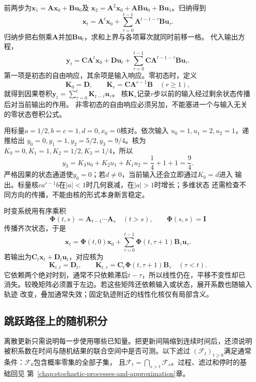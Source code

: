 前两步为$\bm x_1=\bm A\bm x_0+\bm B\bm u_0$及
$\bm x_2=\bm A^2\bm x_0+\bm A\bm B\bm u_0+\bm B\bm u_1$。归纳得到
\begin{equation}
  \bm x_t=\bm A^t\bm x_0+
    \sum_{\tau=0}^{t-1}\bm A^{t-1-\tau}\bm B\bm u_\tau.
  \label{eq:signal-analysis-state-unrolling}
\end{equation}
归纳步把右侧乘$\bm A$并加$\bm B\bm u_t$，求和上界与各项幂次就同时前移一格。
代入输出方程，
\begin{equation}
  \bm y_t=\bm C\bm A^t\bm x_0+\bm D\bm u_t+
    \sum_{\tau=0}^{t-1}\bm C\bm A^{t-1-\tau}\bm B\bm u_\tau.
  \label{eq:signal-analysis-state-convolution}
\end{equation}
第一项是初态的自由响应，其余项是输入响应。零初态时，定义
\begin{equation}
  \bm K_0=\bm D,\qquad
  \bm K_r=\bm C\bm A^{r-1}\bm B\quad(r\geq1),
  \label{eq:signal-analysis-state-kernel}
\end{equation}
就得到因果卷积$\bm y_t=\sum_{\tau=0}^t\bm K_{t-\tau}\bm u_\tau$。
核$\bm K_r$记录$r$步以前的输入经过剩余状态传播后对当前输出的作用。
非零初态的自由响应必须另加，不能塞进一个与输入无关的零状态卷积公式。

用标量$a=1/2,b=c=1,d=0,x_0=0$核对。依次输入
$u_0=1,u_1=2,u_2=1$，递推给出
$y_0=0,y_1=1,y_2=5/2,y_3=9/4$。核为
$K_0=0,K_1=1,K_2=1/2,K_3=1/4$，所以
\[
  y_3=K_3u_0+K_2u_1+K_1u_2=\frac14+1+1=\frac94.
\]
严格因果的状态通道使$y_0=0$；若$d\neq0$，当前输入还会立即通过$K_0=d$进入
输出。标量核$ca^{r-1}b$在$|a|<1$时几何衰减，在$|a|>1$时增长；多维状态
还需检查不同方向的传播，不能由核的形式本身断言稳定。

时变系统用有序乘积
\[
  \bm\Phi(t,s)=\bm A_{t-1}\cdots\bm A_s\quad(t>s),\qquad
  \bm\Phi(s,s)=\bm I
\]
传播齐次状态，于是
\[
  \bm x_t=\bm\Phi(t,0)\bm x_0+
    \sum_{\tau=0}^{t-1}\bm\Phi(t,\tau+1)\bm B_\tau\bm u_\tau.
\]
若输出为$\bm C_t\bm x_t+\bm D_t\bm u_t$，对应核为
\[
  \bm K_{t,t}=\bm D_t,\qquad
  \bm K_{t,\tau}=\bm C_t\bm\Phi(t,\tau+1)\bm B_\tau\quad(\tau<t).
\]
它依赖两个绝对时刻，通常不只依赖滞后$t-\tau$，所以线性仍在，平移不变性却已
消失。较晚矩阵必须置于左边。若这些矩阵还依赖输入或状态，展开系数也随输入轨迹
改变，叠加通常失效；固定轨迹附近的线性化核仅有局部含义。


\subsection{跳跃路径上的随机积分}
\label{sec:action-state-poisson-integral}

离散更新只需说明每一步使用哪些已知量。把更新间隔缩到连续时间后，还须说明
被积系数在时间与随机结果的联合空间中是否可测。以下滤过
$(\mathcal F_t)_{t\geq0}$满足通常条件：$\mathcal F_0$包含概率零集的全部子集，
且$\mathcal F_t=\bigcap_{s>t}\mathcal F_s$。过程、滤过和停时的基础回见
第~\ref{chap:stochastic-processes-and-approximation}章。

